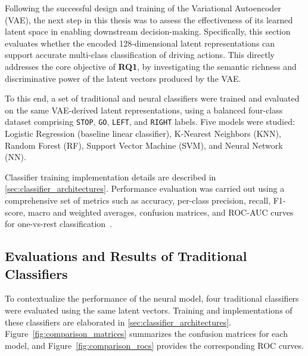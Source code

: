 Following the successful design and training of the Variational Autoencoder (VAE), the next step in this thesis was to assess the effectiveness of its learned latent space in enabling downstream decision-making. Specifically, this section evaluates whether the encoded 128-dimensional latent representations can support accurate multi-class classification of driving actions. This directly addresses the core objective of \textbf{RQ1}, by investigating the semantic richness and discriminative power of the latent vectors produced by the VAE.

To this end, a set of traditional and neural classifiers were trained and evaluated on the same VAE-derived latent representations, using a balanced four-class dataset comprising \texttt{STOP}, \texttt{GO}, \texttt{LEFT}, and \texttt{RIGHT} labels. Five models were studied: Logistic Regression (baseline linear classifier), K-Nearest Neighbors (KNN), Random Forest (RF), Support Vector Machine (SVM), and Neural Network (NN).

Classifier training implementation details are described in \cref{sec:classifier_architectures}. Performance evaluation was carried out using a comprehensive set of metrics such as accuracy, per-class precision, recall, F1-score, macro and weighted averages, confusion matrices, and ROC-AUC curves for one-vs-rest classification~\cite{labelf2025metrics, roc_auc2024, svm_rf_knn2017}.



\subsection{Evaluations and Results of Traditional Classifiers} \label{subsec:comparision_with_traditional_classifiers}

To contextualize the performance of the neural model, four traditional classifiers were evaluated using the same latent vectors. Training and implementations of these classifiers are elaborated in \cref{sec:classifier_architectures}. Figure~\ref{fig:comparison_matrices} summarizes the confusion matrices for each model, and Figure~\ref{fig:comparison_rocs} provides the corresponding ROC curves.

